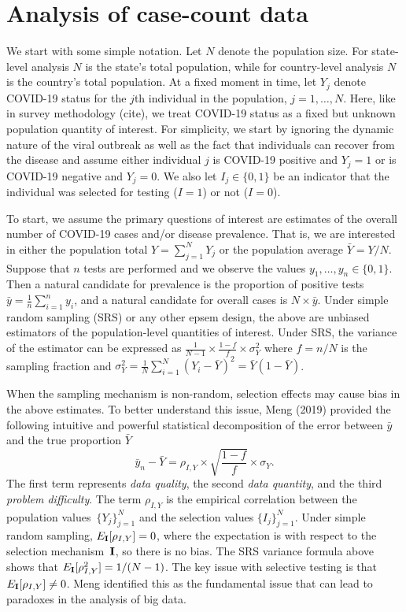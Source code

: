 \documentclass[aoas]{amsart}
\def\I{\bf I}
\begin{document}
\section{Analysis of case-count data}

We start with some simple notation.  Let $N$ denote the population size.  For state-level analysis $N$ is the state's total population, while for country-level analysis $N$ is the country's total population.  At a fixed moment in time, let $Y_j$ denote COVID-19 status for the $j$th individual in the population, $j=1,\ldots, N$. Here, like in survey methodology (cite), we treat COVID-19 status as a fixed but unknown population quantity of interest. For simplicity, we start by ignoring the dynamic nature of the viral outbreak as well as the fact that individuals can recover from the disease and assume either individual $j$ is COVID-19 positive and $Y_j=1$ or is COVID-19 negative and $Y_j=0$. We also let $I_j \in \{0,1\}$ be an indicator that the individual was selected for testing ($I = 1$) or not ($I=0$).

To start, we assume the primary questions of interest are estimates of the overall number of COVID-19 cases and/or disease prevalence. That is, we are interested in either the population total $Y = \sum_{j=1}^N Y_j$ or the population average $\bar Y = Y/N$. Suppose that $n$ tests are performed and we observe the values $y_1, \ldots, y_n \in \{0,1\}$.  Then a natural candidate for prevalence is the proportion of positive tests $\bar y = \frac{1}{n} \sum_{i=1}^n y_i$, and a natural candidate for overall cases is $N \times \bar y$.
Under simple random sampling (SRS) or any other epsem design, the above are unbiased estimators of the population-level quantities of interest.  Under SRS, the variance of the estimator can be expressed as $\frac{1}{N-1} \times \frac{1-f}{f} \times \sigma_Y^2$ where $f = n/N$ is the sampling fraction and $\sigma_Y^2 = \frac{1}{N} \sum_{i=1}^N (Y_i - \bar Y)^2 = \bar Y (1- \bar Y)$.

When the sampling mechanism is non-random, selection effects may cause bias in the above estimates. To better understand this issue, Meng (2019) provided the following intuitive and powerful statistical decomposition of the error between $\bar y$ and the true proportion $\bar Y$
$$
\bar y_n - \bar Y =  \rho_{I, Y} \times \sqrt{\frac{1-f}{f}} \times \sigma_Y.
$$
The first term represents \emph{data quality}, the second \emph{data quantity}, and the third \emph{problem difficulty}. The term $\rho_{I,Y}$ is the empirical correlation between the population values~$\{ Y_j \}_{j=1}^N$ and the selection values $\{ I_j \}_{j=1}^N$.  Under simple random sampling, $E_{\I} [ \rho_{I,Y} ] = 0$, where the expectation is with respect to the selection mechanism~$\I$, so there is no bias.  The SRS variance formula above shows that $E_{\I} [ \rho_{I,Y}^2 ]  = 1/(N-1)$.  The key issue with selective testing is that $E_{\I} [ \rho_{I,Y} ] \neq 0$.  Meng identified this as the fundamental issue that can lead to paradoxes in the analysis of big data.
\end{document}
